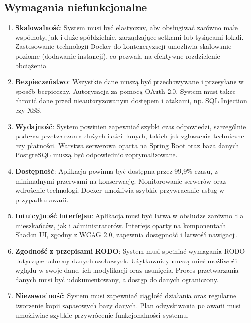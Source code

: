 \subsection{Wymagania niefunkcjonalne}

\begin{enumerate}[label=\arabic*.,labelwidth=\widthof{10}]

   \item \textbf{Skalowalność}: System musi być elastyczny, aby obsługiwać zarówno małe wspólnoty, jak i duże spółdzielnie, zarządzające setkami lub tysiącami lokali. Zastosowanie technologii Docker do konteneryzacji umożliwia skalowanie poziome (dodawanie instancji), co pozwala na efektywne rozdzielenie obciążenia.

	\item \textbf{Bezpieczeństwo}: Wszystkie dane muszą być przechowywane i przesyłane w sposób bezpieczny. Autoryzacja za pomocą OAuth 2.0. System musi także chronić dane przed nieautoryzowanym dostępem i atakami, np. SQL Injection czy XSS.

	\item \textbf{Wydajność}: System powinien zapewniać szybki czas odpowiedzi, szczególnie podczas przetwarzania dużych ilości danych, takich jak zgłoszenia techniczne czy płatności. Warstwa serwerowa oparta na Spring Boot oraz baza danych PostgreSQL muszą być odpowiednio zoptymalizowane.

	\item \textbf{Dostępność}: Aplikacja powinna być dostępna przez 99,9\% czasu, z minimalnymi przerwami na konserwację. Monitorowanie serwerów oraz wdrożenie technologii Docker umożliwia szybkie przywracanie usług w przypadku awarii.

	\item \textbf{Intuicyjność interfejsu}: Aplikacja musi być łatwa w obsłudze zarówno dla mieszkańców, jak i administratorów. Interfejs oparty na komponentach Shadcn UI, zgodny z WCAG 2.0, zapewnia dostępność i łatwość nawigacji.

	\item \textbf{Zgodność z przepisami RODO}: System musi spełniać wymagania RODO dotyczące ochrony danych osobowych. Użytkownicy muszą mieć możliwość wglądu w swoje dane, ich modyfikacji oraz usunięcia. Proces przetwarzania danych musi być udokumentowany, a dostęp do danych ograniczony.

	\item \textbf{Niezawodność}: System musi zapewniać ciągłość działania oraz regularne tworzenie kopii zapasowych bazy danych. Plan odzyskiwania po awarii musi umożliwiać szybkie przywrócenie funkcjonalności systemu.


\end{enumerate}
